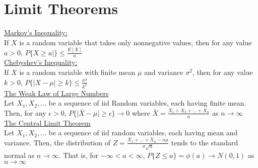 \documentclass{article}
\begin{document}
	\section*{Limit Theorems}
	\underline{Markov's Inequality:} 
	\\ If $X$ is a random variable that takes only nonnegative values, then for any value $a > 0$, $P\{X \geq a|\} \leq \frac{E[X]}{a}$
	\\
	\underline{Chebyshev's Inequality:}
	\\ If $X$ is a random variable with finite mean $\mu$ and variance $\sigma^2$, then for any value $k > 0$, $P\{\vert X - \mu\vert \geq k\} \leq \frac{\sigma^2}{k^2}$
	\\
	\underline{The Weak Law of Large Numbers}
	\\
	Let $X_1, X_2, ...$ be a sequence of iid Random variables, each having finite mean. Then, for any $\epsilon > 0$, $P\{\vert\bar{X} - \mu\vert \geq \epsilon\} \to 0$ where $\bar{X} = \frac{X_1 + X_2 + ... + X_n}{n}$  as $n\to\infty$
	\\
	\underline{The Central Limit Theorem}
	\\
	Let $X_1, X_2,...$ be a sequence of iid random variables, each having mean and variance. Then, the distribution of $Z = \frac{X_1 + ... + X_n - n\mu}{\sigma\sqrt{n}}$ tends to the standard normal as $n\to\infty$. That is, for $-\infty < a < \infty$, $P\{Z \leq a\} = \phi(a) \to N(0,1)$ as $n\to\infty$
	
	
	
\end{document}
